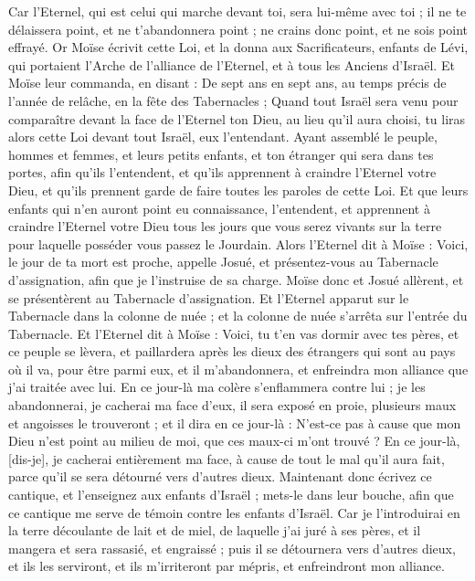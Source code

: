 \begin{multicols}{2}
Car l'Eternel, qui est celui qui marche devant toi, sera lui-même avec toi ; il ne te délaissera point, et ne t'abandonnera point ; ne crains donc point, et ne sois point effrayé.
Or Moïse écrivit cette Loi, et la donna aux Sacrificateurs, enfants de Lévi, qui portaient l'Arche de l'alliance de l'Eternel, et à tous les Anciens d'Israël.
Et Moïse leur commanda, en disant : De sept ans en sept ans, au temps précis de l'année de relâche, en la fête des Tabernacles ;
Quand tout Israël sera venu pour comparaître devant la face de l'Eternel ton Dieu, au lieu qu'il aura choisi, tu liras alors cette Loi devant tout Israël, eux l'entendant.
Ayant assemblé le peuple, hommes et femmes, et leurs petits enfants, et ton étranger qui sera dans tes portes, afin qu'ils l'entendent, et qu'ils apprennent à craindre l'Eternel votre Dieu, et qu'ils prennent garde de faire toutes les paroles de cette Loi.
Et que leurs enfants qui n'en auront point eu connaissance, l'entendent, et apprennent à craindre l'Eternel votre Dieu tous les jours que vous serez vivants sur la terre pour laquelle posséder vous passez le Jourdain.
Alors l'Eternel dit à Moïse : Voici, le jour de ta mort est proche, appelle Josué, et présentez-vous au Tabernacle d'assignation, afin que je l'instruise de sa charge. Moïse donc et Josué allèrent, et se présentèrent au Tabernacle d'assignation.
Et l'Eternel apparut sur le Tabernacle dans la colonne de nuée ; et la colonne de nuée s'arrêta sur l'entrée du Tabernacle.
Et l'Eternel dit à Moïse : Voici, tu t'en vas dormir avec tes pères, et ce peuple se lèvera, et paillardera après les dieux des étrangers qui sont au pays où il va, pour être parmi eux, et il m'abandonnera, et enfreindra mon alliance que j'ai traitée avec lui.
En ce jour-là ma colère s'enflammera contre lui ; je les abandonnerai, je cacherai ma face d'eux, il sera exposé en proie, plusieurs maux et angoisses le trouveront ; et il dira en ce jour-là : N'est-ce pas à cause que mon Dieu n'est point au milieu de moi, que ces maux-ci m'ont trouvé ?
En ce jour-là, [dis-je], je cacherai entièrement ma face, à cause de tout le mal qu'il aura fait, parce qu'il se sera détourné vers d'autres dieux.
Maintenant donc écrivez ce cantique, et l'enseignez aux enfants d'Israël ; mets-le dans leur bouche, afin que ce cantique me serve de témoin contre les enfants d'Israël.
Car je l'introduirai en la terre découlante de lait et de miel, de laquelle j'ai juré à ses pères, et il mangera et sera rassasié, et engraissé ; puis il se détournera vers d'autres dieux, et ils les serviront, et ils m'irriteront par mépris, et enfreindront mon alliance.

\end{multicols}
